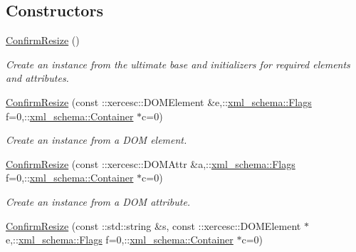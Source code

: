 \subsection*{Constructors}
\begin{DoxyCompactItemize}
\item 
\hypertarget{classopenstack_1_1xml_1_1ConfirmResize_aa54e9b5170cf103d075f1cd068557317}{
\hyperlink{classopenstack_1_1xml_1_1ConfirmResize_aa54e9b5170cf103d075f1cd068557317}{ConfirmResize} ()}
\label{classopenstack_1_1xml_1_1ConfirmResize_aa54e9b5170cf103d075f1cd068557317}

\begin{DoxyCompactList}\small\item\em Create an instance from the ultimate base and initializers for required elements and attributes. \item\end{DoxyCompactList}\item 
\hyperlink{classopenstack_1_1xml_1_1ConfirmResize_a41ad9098e42d700129b51468fdc6937c}{ConfirmResize} (const ::xercesc::DOMElement \&e,::\hyperlink{namespacexml__schema_affb4c227cbd9aa7453dd1dc5a1401943}{xml\_\-schema::Flags} f=0,::\hyperlink{namespacexml__schema_a333dea2213742aea47a37532dec4ec27}{xml\_\-schema::Container} $\ast$c=0)
\begin{DoxyCompactList}\small\item\em Create an instance from a DOM element. \item\end{DoxyCompactList}\item 
\hyperlink{classopenstack_1_1xml_1_1ConfirmResize_a5d7e57511bae42dd8495f98b5f3d938b}{ConfirmResize} (const ::xercesc::DOMAttr \&a,::\hyperlink{namespacexml__schema_affb4c227cbd9aa7453dd1dc5a1401943}{xml\_\-schema::Flags} f=0,::\hyperlink{namespacexml__schema_a333dea2213742aea47a37532dec4ec27}{xml\_\-schema::Container} $\ast$c=0)
\begin{DoxyCompactList}\small\item\em Create an instance from a DOM attribute. \item\end{DoxyCompactList}\item 
\hyperlink{classopenstack_1_1xml_1_1ConfirmResize_aac995bedba3194d074e8e77211881749}{ConfirmResize} (const ::std::string \&s, const ::xercesc::DOMElement $\ast$e,::\hyperlink{namespacexml__schema_affb4c227cbd9aa7453dd1dc5a1401943}{xml\_\-schema::Flags} f=0,::\hyperlink{namespacexml__schema_a333dea2213742aea47a37532dec4ec27}{xml\_\-schema::Container} $\ast$c=0)

\end{DoxyCompactItemize}
